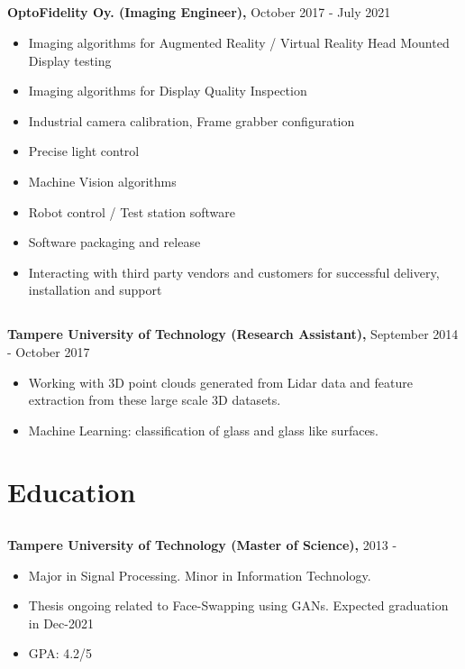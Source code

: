 \documentclass{article}
\begin{document}
\subsection{}
\textbf{OptoFidelity Oy. (Imaging Engineer),} October 2017 - July 2021 
\begin{itemize}[leftmargin=0.75in]
  \item Imaging algorithms for Augmented Reality / Virtual Reality Head Mounted Display testing
  \item Imaging algorithms for Display Quality Inspection
  \item Industrial camera calibration, Frame grabber configuration
  \item Precise light control
  \item Machine Vision algorithms
  \item Robot control / Test station software
  \item Software packaging and release
  \item Interacting with third party vendors and customers for successful
    delivery, installation and support
\end{itemize}


\subsection{}
\textbf{Tampere University of Technology (Research Assistant),} September 2014 -
  October 2017

\begin{itemize}[leftmargin=0.75in]
  \item Working with 3D point clouds generated from Lidar data and feature
    extraction from these large scale 3D datasets.
  \item Machine Learning: classification of glass and glass like surfaces. 
\end{itemize}

\section{Education}
\subsection{}
\textbf{Tampere University of Technology (Master of Science),} 2013 - 
\begin{itemize}[label={--}]
  \itemsep0em 
  \item Major in Signal Processing. Minor in Information Technology.
  \item Thesis ongoing related to Face-Swapping using GANs. Expected graduation in Dec-2021
  \item GPA: 4.2/5
\end{itemize}
\end{document}
